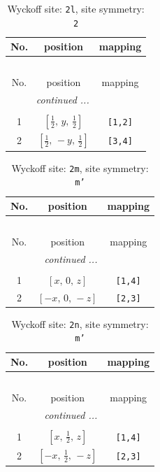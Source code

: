 \documentclass[fleqn,8pt]{jsarticle}
\begin{document}
\begin{longtable}{ccc}
\caption{Wyckoff site: {\tt 2l}, site symmetry: {\tt 2}}
 \\
 \hline \hline
No. & position & mapping \\ \hline \endfirsthead

\multicolumn{2}{l}{\tablename\ \thetable{}} \\
 \hline \hline
No. & position & mapping \\ \hline \endhead

 \hline \hline
\multicolumn{2}{r}{\footnotesize\it continued ...} \\ \endfoot

 \hline \hline
\multicolumn{2}{r}{} \\ \endlastfoot

1 & $\left[ \frac{1}{2},\, y,\, \frac{1}{2} \right]$ & {\tt [1,2]} \\ \hline
2 & $\left[ \frac{1}{2},\, - y,\, \frac{1}{2} \right]$ & {\tt [3,4]} \\
\end{longtable}
\renewcommand{\arraystretch}{1.2}
\begin{longtable}{ccc}
\caption{Wyckoff site: {\tt 2m}, site symmetry: {\tt m'}}
 \\
 \hline \hline
No. & position & mapping \\ \hline \endfirsthead

\multicolumn{2}{l}{\tablename\ \thetable{}} \\
 \hline \hline
No. & position & mapping \\ \hline \endhead

 \hline \hline
\multicolumn{2}{r}{\footnotesize\it continued ...} \\ \endfoot

 \hline \hline
\multicolumn{2}{r}{} \\ \endlastfoot

1 & $\left[ x,\, 0,\, z \right]$ & {\tt [1,4]} \\ \hline
2 & $\left[ - x,\, 0,\, - z \right]$ & {\tt [2,3]} \\
\end{longtable}
\renewcommand{\arraystretch}{1.2}
\begin{longtable}{ccc}
\caption{Wyckoff site: {\tt 2n}, site symmetry: {\tt m'}}
 \\
 \hline \hline
No. & position & mapping \\ \hline \endfirsthead

\multicolumn{2}{l}{\tablename\ \thetable{}} \\
 \hline \hline
No. & position & mapping \\ \hline \endhead

 \hline \hline
\multicolumn{2}{r}{\footnotesize\it continued ...} \\ \endfoot

 \hline \hline
\multicolumn{2}{r}{} \\ \endlastfoot

1 & $\left[ x,\, \frac{1}{2},\, z \right]$ & {\tt [1,4]} \\ \hline
2 & $\left[ - x,\, \frac{1}{2},\, - z \right]$ & {\tt [2,3]} \\
\end{longtable}
\end{document}
